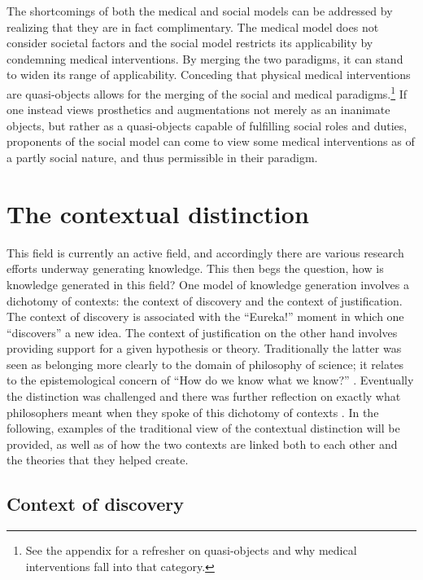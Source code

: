 \documentclass[a4paper]{article}
\begin{document}
The shortcomings of both the medical and social models can be addressed by
realizing that they are in fact complimentary. The medical model does not
consider societal factors and the social model restricts its applicability by
condemning medical interventions. By merging the two paradigms, it can stand
to widen its range of applicability. Conceding that physical medical
interventions are  quasi-objects allows for the merging of the social and
medical paradigms.\footnote{See the appendix for a refresher on quasi-objects
and why medical interventions fall into that category.} If one instead views
prosthetics and augmentations not merely as an inanimate objects, but rather
as a quasi-objects capable of fulfilling social roles and duties, proponents
of the social model can come to view some medical interventions as of a partly
social nature, and thus permissible in their paradigm.

\newpage
\section{The contextual distinction}

This field is currently an active field, and accordingly there are various
research efforts underway generating knowledge. This then begs the question,
how is knowledge generated in this field? One model of knowledge generation
involves a dichotomy of contexts: the context of discovery and the context of
justification. The context of discovery is associated with the ``Eureka!''
moment in which one ``discovers'' a new idea. The context of justification on
the other hand involves providing support for a given hypothesis or theory.
Traditionally the latter was seen as belonging more clearly to the domain of
philosophy of science; it relates to the epistemological concern of ``How do
we know what we know?'' \citep{schickore2014scientific}. Eventually the
distinction was challenged and there was further reflection on exactly what
philosophers meant when they spoke of this dichotomy of contexts
\citep{hoyningen2006context}. In the following, examples of the traditional
view of the contextual distinction will be provided, as well as of how the two
contexts are linked both to each other and the theories that they helped
create.

\subsection{Context of discovery}
\end{document}
